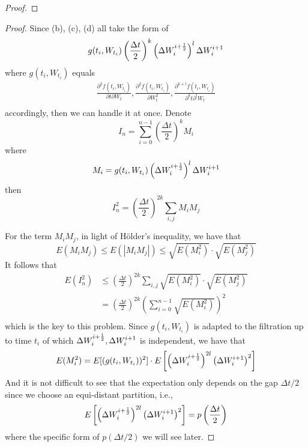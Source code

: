 \begin{subproblem}[(\alph*)]
\begin{proof}
        \end{proof}

        \item
        \begin{proof}
        Since (b), (c), (d) all take the form of
        \newcommand{\gt}[1]{g(#1,W_{#1})}
        \newcommand{\increment}{\left(\frac{\Delta t}{2}\right)}
        \[\gt{t_i}\increment^k\left(\dws i\right)^l\dw i\]
        where $\gt{t_i}$ equals
        \[\begin{aligned}
            \frac{\partial^2f(t_i,W_{t_i})}{\partial t\partial W_t},
            \frac{\partial^2f(t_i,W_{t_i})}{\partial W_t^2},
            \frac{\partial^{k+l}f(t_i,W_{t_i})}{\partial^kt\partial^l W_t}\\
        \end{aligned}\]
        accordingly,
        then we can handle it at once.
        Denote
        \[I_n=\sum_{i=0}^{n-1}
        \increment^k M_i\]
        where
        \[M_i=
        \gt{t_i}\left(\dws i\right)^l\dw i\]
        then
        \[
            I_n^2=\increment^{2k}
            \sum_{i,j}M_iM_j
        \]

        For the term $M_iM_j$, in light of H\"older's inequality,
        we have that
        \[E(M_iM_j)\leq E(|M_iM_j|)\leq \sqrt{E(M_i^2)}\cdot\sqrt{E(M_j^2)}\]
        It follows that
        \begin{equation}
            \label{eq:EIn2<=}
            \begin{aligned}
            E(I_n^2)&\leq
            \increment^{2k}
            \sum_{i,j}\sqrt{E(M_i^2)}\cdot\sqrt{E(M_j^2)}\\
        &=\increment^{2k}\left(\sum_{i=0}^{n-1}\sqrt{E(M_i^2)}\right)^2\\
        \end{aligned}\end{equation}
        which is the key to this problem.
        Since $\gt{t_i}$ is adapted to the filtration up to time $t_i$
        of which $\Delta W_{i}^{i+\frac{1}{2}},\Delta W_{i}^{i+1}$ is independent, we have that
        \begin{equation}
            \label{eq:EMi2}
            E(M_i^2)=E[(\gt{t_i})^2]\cdot
            E\left[\left(\dws i\right)^{2l}\left(\dw i\right)^2\right]
        \end{equation}
        And it is not difficult to see that
        the expectation only depends
        on the gap $\Delta t/2$ since we choose an equi-distant partition,
        i.e.,
        \[
            E\left[
            \left(\Delta W_{i}^{i+\frac{1}{2}}\right)^{2l}
            \left(\Delta W_{i}^{i+1}\right)^2
            \right]
            =p\left(\frac{\Delta t}{2}\right)
        \]
        where the specific form of $p(\Delta t/2)$
        we will see later.


\end{proof}
\end{subproblem}
